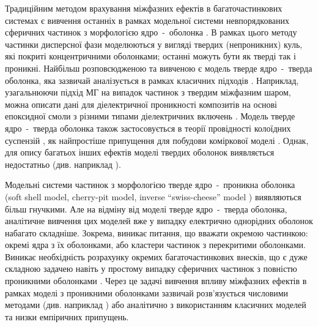 \documentclass[14pt,twoside]{vakthesis}
\begin{document}
Традиційним методом врахування міжфазних ефектів в багаточастинкових системах є вивчення останніх в рамках модельної системи невпорядкованих сферичних частинок з морфологією ядро~-~оболонка \cite{Torquato, Choy}. В рамках цього методу частинки дисперсної фази моделюються у вигляді твердих (непроникних) куль, які покриті концентричними оболонками; останні можуть бути як тверді так і проникні.
Найбільш розповсюдженою та вивченою є модель тверде ядро~-~тверда оболонка, яка зазвичай аналізується в рамках класичних підходів \cite{Choy,Sihvola1999}. Наприклад, узагальнюючи підхід МГ на випадок частинок з твердим міжфазним шаром, можна описати дані для діелектричної проникності композитів на основі епоксидної смоли з різними типами діелектричних включень \cite{Vo2002}. 
Модель тверде ядро~-~тверда оболонка також застосовується в теорії провідності колоїдних суспензій \cite{Ohshima1982,Lyklema1995}, як найпростіше припущення для побудови коміркової моделі \cite{Lyklema1995,Torquato}.
Однак, для опису багатьох інших ефектів моделі твердих оболонок виявляється недостатньо (див. наприклад \cite{Wiec1994,  Tomylko2015, Singh2018}). 


Модельні системи частинок з морфологією тверде ядро~-~проникна оболонка (soft shell model, cherry-pit model, inverse ``swiss-cheese'' model \cite{Torquato}) виявляються більш гнучкими.
Але на відміну від моделі тверде ядро~-~тверда оболонка, аналітичне вивчення цих моделей вже у випадку електрично однорідних оболонок набагато складніше. Зокрема, виникає питання, що вважати окремою частинкою: окремі ядра з їх оболонками, або кластери частинок з перекритими оболонками. Виникає необхідність розрахунку окремих багаточастинкових внесків, що є дуже складною задачею навіть у простому випадку сферичних частинок з повністю проникними оболонками \cite{Torquato}. 
Через це задачі вивчення впливу міжфазних ефектів в рамках моделі з проникними оболонками зазвичай розв'язується числовими методами (див. наприклад \cite{Myroshnychenko2008,Myroshnychenko2009}) або аналітично з використанням класичних моделей та низки емпіричних припущень.
\end{document}
